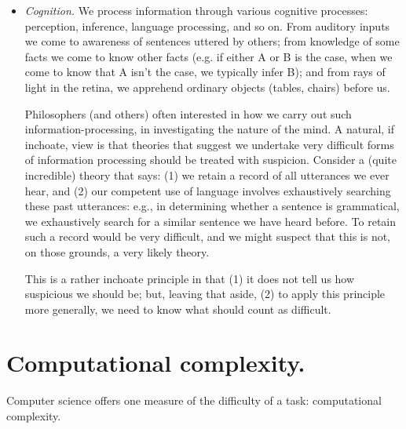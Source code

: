 \begin{itemize}
    \item \emph{Cognition.} We process information through various cognitive processes: perception, inference, language processing, and so on. From auditory inputs we come to awareness of sentences uttered by others; from knowledge of some facts we come to know other facts (e.g. if either A or B is the case, when we come to know that A isn’t the case, we typically infer B); and from rays of light in the retina, we apprehend ordinary objects (tables, chairs) before us.

    Philosophers (and others) often interested in how we carry out such information-processing, in investigating the nature of the mind. A natural, if inchoate, view is that theories that suggest we undertake very difficult forms of information processing should be treated with suspicion. Consider a (quite incredible) theory that says: (1) we retain a record of all utterances we ever hear, and (2) our competent use of language involves exhaustively searching these past utterances: e.g., in determining whether a sentence is grammatical, we exhaustively search for a similar sentence we have heard before. To retain such a record would be very difficult, and we might suspect that this is not, on those grounds, a very likely theory.
    
    This is a rather inchoate principle in that (1) it does not tell us how suspicious we should be; but, leaving that aside, (2) to apply this principle more generally, we need to know what should count as difficult.
\end{itemize}
\section*{Computational complexity.}
Computer science offers one measure of the difficulty of a task: computational complexity.


